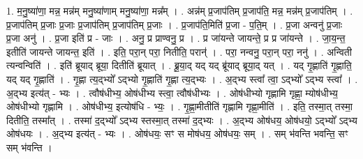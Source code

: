 \documentclass[17pt]{extarticle}
\begin{document}
1. म॒नु॒ष्या॑णा॒ मन्न॒ मन्न॑म् मनु॒ष्या॑णाम् मनु॒ष्या॑णा॒ मन्न᳚म् । . अन्न॑म् प्र॒जाप॑तिम् प्र॒जाप॑ति॒ मन्न॒ मन्न॑म् प्र॒जाप॑तिम् । . प्र॒जाप॑तिम् प्र॒जाः प्र॒जाः प्र॒जाप॑तिम् प्र॒जाप॑तिम् प्र॒जाः । . प्र॒जाप॑ति॒मिति॑ प्र॒जा - प॒ति॒म् । . प्र॒जा अन्वनु॑ प्र॒जाः प्र॒जा अनु॑ । . प्र॒जा इति॑ प्र - जाः । . अनु॒ प्र प्राण्वनु॒ प्र । . प्र जा॑यन्ते जायन्ते॒ प्र प्र जा॑यन्ते । . जा॒य॒न्त॒ इतीति॑ जायन्ते जायन्त॒ इति॑ । . इति॒ परा॒न् परा॒ नितीति॒ परान्॑ । . परा॒ नन्वनु॒ परा॒न् परा॒ ननु॑ । . अन्विती त्यन्वन्विति॑ । . इति॑ ब्रूयाद् ब्रूया॒ दितीति॑ ब्रूयात् । . ब्रू॒या॒द् यद् यद् ब्रू॑याद् ब्रूया॒द् यत् । . यद् गृ॒ह्णाति॑ गृ॒ह्णाति॒ यद् यद् गृ॒ह्णाति॑ । . गृ॒ह्णा त्य॒द्भ्यो᳚ ऽद्भ्यो गृ॒ह्णाति॑ गृ॒ह्णा त्य॒द्भ्यः । . अ॒द्भ्य स्त्वा᳚ त्वा॒ ऽद्भ्यो᳚ ऽद्भ्य स्त्वा᳚ । . अ॒द्भ्य इत्य॑त् - भ्यः । . त्वौष॑धीभ्य॒ ओष॑धीभ्य स्त्वा॒ त्वौष॑धीभ्यः । . ओष॑धीभ्यो गृह्णामि गृह्णा॒ म्योष॑धीभ्य॒ ओष॑धीभ्यो गृह्णामि । . ओष॑धीभ्य॒ इत्योष॑धि - भ्यः॒ । . गृ॒ह्णा॒मीतीति॑ गृह्णामि गृह्णा॒मीति॑ । . इति॒ तस्मा॒त् तस्मा॒ दितीति॒ तस्मा᳚त् । . तस्मा॑ द॒द्भ्यो᳚ ऽद्भ्य स्तस्मा॒त् तस्मा॑ द॒द्भ्यः । . अ॒द्भ्य ओष॑धय॒ ओष॑धयो॒ ऽद्भ्यो᳚ ऽद्भ्य ओष॑धयः । . अ॒द्भ्य इत्य॑त् - भ्यः । . ओष॑धयः॒ सꣳ स मोष॑धय॒ ओष॑धयः॒ सम् । . सम् भ॑वन्ति भवन्ति॒ सꣳ सम् भ॑वन्ति । \newline
\end{document}
